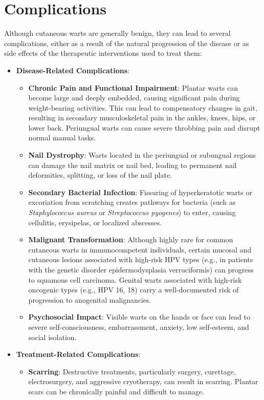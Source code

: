 \section*{Complications}
Although cutaneous warts are generally benign, they can lead to several complications, either as a result of the natural progression of the disease or as side effects of the therapeutic interventions used to treat them:
\begin{itemize}
    \item \textbf{Disease-Related Complications}:
    \begin{itemize}
        \item \textbf{Chronic Pain and Functional Impairment}: Plantar warts can become large and deeply embedded, causing significant pain during weight-bearing activities. This can lead to compensatory changes in gait, resulting in secondary musculoskeletal pain in the ankles, knees, hips, or lower back. Periungual warts can cause severe throbbing pain and disrupt normal manual tasks.
        \item \textbf{Nail Dystrophy}: Warts located in the periungual or subungual regions can damage the nail matrix or nail bed, leading to permanent nail deformities, splitting, or loss of the nail plate.
        \item \textbf{Secondary Bacterial Infection}: Fissuring of hyperkeratotic warts or excoriation from scratching creates pathways for bacteria (such as \textit{Staphylococcus aureus} or \textit{Streptococcus pyogenes}) to enter, causing cellulitis, erysipelas, or localized abscesses.
        \item \textbf{Malignant Transformation}: Although highly rare for common cutaneous warts in immunocompetent individuals, certain mucosal and cutaneous lesions associated with high-risk HPV types (e.g., in patients with the genetic disorder epidermodysplasia verruciformis) can progress to squamous cell carcinoma. Genital warts associated with high-risk oncogenic types (e.g., HPV 16, 18) carry a well-documented risk of progression to anogenital malignancies.
        \item \textbf{Psychosocial Impact}: Visible warts on the hands or face can lead to severe self-consciousness, embarrassment, anxiety, low self-esteem, and social isolation.
    \end{itemize}
    \item \textbf{Treatment-Related Complications}:
    \begin{itemize}
        \item \textbf{Scarring}: Destructive treatments, particularly surgery, curettage, electrosurgery, and aggressive cryotherapy, can result in scarring. Plantar scars can be chronically painful and difficult to manage.

\end{itemize}
\end{itemize}
